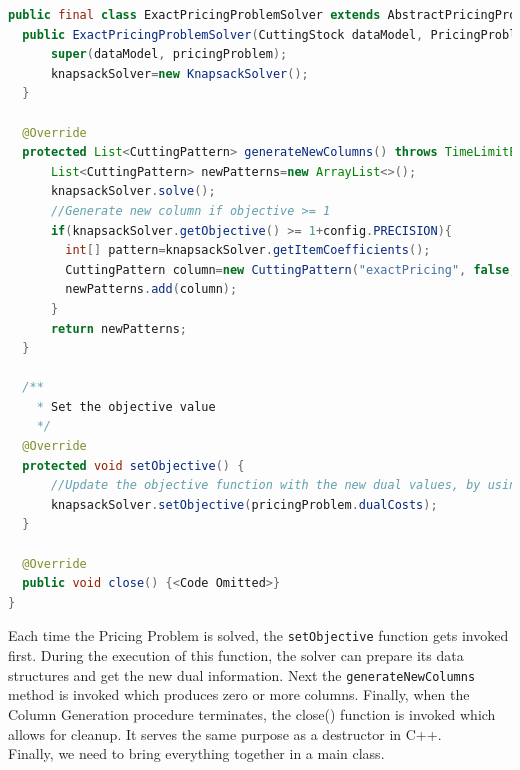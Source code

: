 \documentclass[a4paper]{article}
\newenvironment{myblock}[1]{%
    \tcolorbox[beamer,%
    noparskip,breakable,
    colback=lightBlueCodeBlock,colframe=darkBlueCodeBlock,%
    colbacklower=darkBlueCodeBlock!75!lightBlueCodeBlock,%
    coltitle=blueTitleCodeBlock,
    title=#1]}%
    {\endtcolorbox}
\newcommand{\code}[1]{\lstinline[language=java, style=seminar]!#1!}
\begin{document}
\begin{myblock}{ExactPricingProblemSolver}
\begin{lstlisting}[language=java, style=eclipseArticle, xleftmargin=2em]  
public final class ExactPricingProblemSolver extends AbstractPricingProblemSolver<CuttingStock, CuttingPattern, PricingProblem> {
  public ExactPricingProblemSolver(CuttingStock dataModel, PricingProblem pricingProblem) {
	  super(dataModel, pricingProblem);
	  knapsackSolver=new KnapsackSolver();
  }

  @Override
  protected List<CuttingPattern> generateNewColumns() throws TimeLimitExceededException {
	  List<CuttingPattern> newPatterns=new ArrayList<>();
	  knapsackSolver.solve();
	  //Generate new column if objective >= 1
	  if(knapsackSolver.getObjective() >= 1+config.PRECISION){
	    int[] pattern=knapsackSolver.getItemCoefficients();
	    CuttingPattern column=new CuttingPattern("exactPricing", false, pattern, pricingProblem);
	    newPatterns.add(column);
	  }
	  return newPatterns;
  }

  /**
    * Set the objective value
    */
  @Override
  protected void setObjective() {
	  //Update the objective function with the new dual values, by using the fields in the pricingProblem, e.g. pricingProblem.dualCosts
	  knapsackSolver.setObjective(pricingProblem.dualCosts);
  }

  @Override
  public void close() {<Code Omitted>}
}
\end{lstlisting}
\end{myblock}
Each time the Pricing Problem is solved, the \code{setObjective} function gets invoked first. During the execution of this function, the solver can prepare its data structures and get the new dual information. Next the \code{generateNewColumns} method is invoked which produces zero or more columns. Finally, when the Column Generation procedure terminates, the close() function is invoked which allows for cleanup. It serves the same purpose as a destructor in C++.\\
Finally, we need to bring everything together in a main class.
\end{document}
